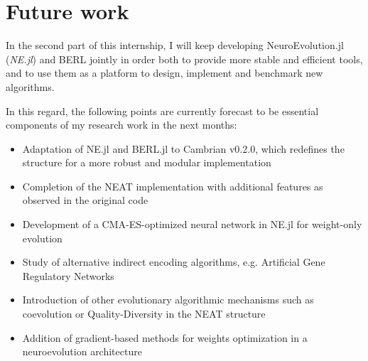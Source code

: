 \section{Future work}

In the second part of this internship, I will keep developing NeuroEvolution.jl (\textit{NE.jl}) and BERL jointly in order both to provide more stable and efficient tools, and to use them as a platform to design, implement and benchmark new algorithms. 

In this regard, the following points are currently forecast to be essential components of my research work in the next months:
\begin{itemize}
    \item Adaptation of NE.jl and BERL.jl to Cambrian v0.2.0, which redefines the structure for a more robust and modular implementation
    \item Completion of the NEAT implementation with additional features as observed in the original code
    \item Development of a CMA-ES-optimized neural network in NE.jl for weight-only evolution
    \item Study of alternative indirect encoding algorithms, e.g. Artificial Gene Regulatory Networks \cite{GRN}
    \item Introduction of other evolutionary algorithmic mechanisms such as coevolution or Quality-Diversity in the NEAT structure
    \item Addition of gradient-based methods for weights optimization in a neuroevolution architecture
\end{itemize}

